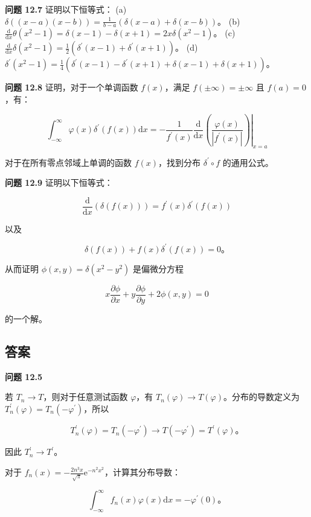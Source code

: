 \textbf{问题 12.7} 证明以下恒等式： (a)
\(\delta((x-a)(x-b)) = \frac{1}{b-a}(\delta(x-a) + \delta(x-b))\)。 (b)
\(\frac{\mathrm{d}}{\mathrm{d}x} \theta(x^2-1) = \delta(x-1) - \delta(x+1) = 2x \delta(x^2-1)\)。
(c)
\(\frac{\mathrm{d}}{\mathrm{d}x} \delta(x^2-1) = \frac{1}{2}\left(\delta^{\prime}(x-1) + \delta^{\prime}(x+1)\right)\)。
(d)
\(\delta^{\prime}(x^2-1) = \frac{1}{4}\left(\delta^{\prime}(x-1) - \delta^{\prime}(x+1) + \delta(x-1) + \delta(x+1)\right)\)。

\textbf{问题 12.8} 证明，对于一个单调函数 \(f(x)\)，满足
\(f(\pm \infty) = \pm \infty\) 且 \(f(a) = 0\)，有：

\[
\int_{-\infty}^\infty \varphi(x) \delta^{\prime}(f(x)) \mathrm{d}x = -\left.\frac{1}{f^{\prime}(x)} \frac{\mathrm{d}}{\mathrm{d}x}\left(\frac{\varphi(x)}{\left|f^{\prime}(x)\right|}\right)\right|_{x=a}
\]

对于在所有零点邻域上单调的函数 \(f(x)\)，找到分布
\(\delta^{\prime} \circ f\) 的通用公式。

\textbf{问题 12.9} 证明以下恒等式：

\[
\frac{\mathrm{d}}{\mathrm{d}x} (\delta(f(x))) = f^{\prime}(x) \delta^{\prime}(f(x))
\]

以及

\[
\delta(f(x)) + f(x) \delta^{\prime}(f(x)) = 0。
\]

从而证明 \(\phi(x, y) = \delta(x^2 - y^2)\) 是偏微分方程

\[
x \frac{\partial \phi}{\partial x} + y \frac{\partial \phi}{\partial y} + 2 \phi(x, y) = 0
\]

的一个解。

\subsection{答案}\label{ux7b54ux6848}

\textbf{问题 12.5}

若 \(T_n \to T\)，则对于任意测试函数 \(\varphi\)，有
\(T_n(\varphi) \to T(\varphi)\)。分布的导数定义为
\(T_n^{\prime}(\varphi) = T_n(-\varphi^{\prime})\)，所以

\[
T_n^{\prime}(\varphi) = T_n(-\varphi^{\prime}) \to T(-\varphi^{\prime}) = T^{\prime}(\varphi)。
\]

因此 \(T_n^{\prime} \to T^{\prime}\)。

对于
\(f_n(x) = -\frac{2 n^3 x}{\sqrt{\pi}} \mathrm{e}^{-n^2 x^2}\)，计算其分布导数：

\[
\int_{-\infty}^\infty f_n(x) \varphi(x) \mathrm{d}x = -\varphi^{\prime}(0)。
\]


